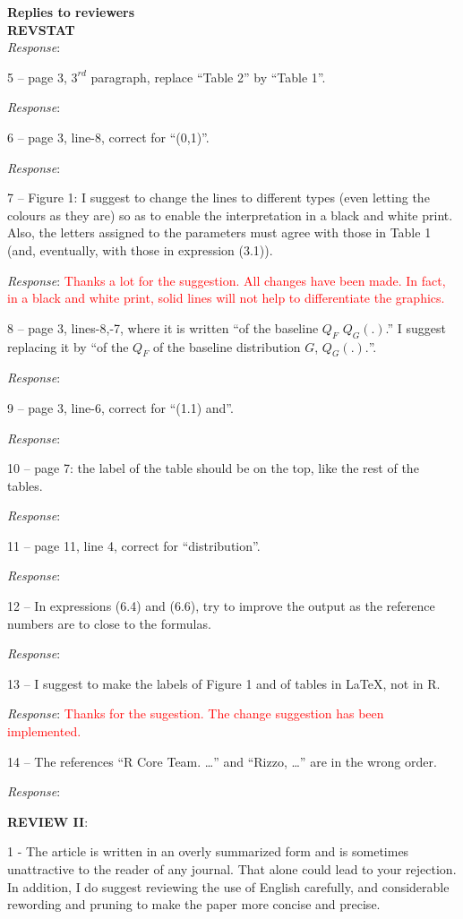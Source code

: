 \documentclass[version=last,12pt,{"maintainersDelight"},letterpaper,]{scrlttr2}
\begin{document}
\begin{letter}{\textbf{Replies to reviewers}\\\textbf{REVSTAT}\\}
\emph{Response}:

5 -- page 3, \(3^{rd}\) paragraph, replace ``Table 2'' by ``Table 1''.

\emph{Response}:

6 -- page 3, line-8, correct for ``(0,1)''.

\emph{Response}:

7 -- Figure 1: I suggest to change the lines to different types (even
letting the colours as they are) so as to enable the interpretation in a
black and white print. Also, the letters assigned to the parameters must
agree with those in Table 1 (and, eventually, with those in expression
(3.1)).

\emph{Response}:
\textcolor{red}{Thanks a lot for the suggestion. All changes have been made. In fact, in a black and white print, solid lines will not help to differentiate the graphics.}

8 -- page 3, lines-8,-7, where it is written ``of the baseline \(Q_F\)
\(Q_G(.)\).'' I suggest replacing it by ``of the \(Q_F\) of the baseline
distribution \(G\), \(Q_G(.).\)''.

\emph{Response}:

9 -- page 3, line-6, correct for ``(1.1) and''.

\emph{Response}:

10 -- page 7: the label of the table should be on the top, like the rest
of the tables.

\emph{Response}:

11 -- page 11, line 4, correct for ``distribution''.

\emph{Response}:

12 -- In expressions (6.4) and (6.6), try to improve the output as the
reference numbers are to close to the formulas.

\emph{Response}:

13 -- I suggest to make the labels of Figure 1 and of tables in \LaTeX,
not in R.

\emph{Response}:
\textcolor{red}{Thanks for the sugestion. The change suggestion has been implemented.}

14 -- The references ``R Core Team. \ldots{}'' and ``Rizzo, \ldots{}''
are in the wrong order.

\emph{Response}:

\textbf{REVIEW II}:

1 - The article is written in an overly summarized form and is sometimes
unattractive to the reader of any journal. That alone could lead to your
rejection. In addition, I do suggest reviewing the use of English
carefully, and considerable rewording and pruning to make the paper more
concise and precise.


\end{letter}
\end{document}
